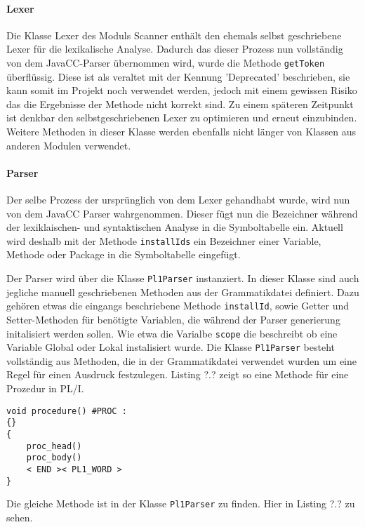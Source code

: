 \paragraph{Lexer}
Die Klasse Lexer des Moduls Scanner enthält den ehemals selbst geschriebene Lexer für die lexikalische Analyse. Dadurch das dieser Prozess nun vollständig von dem JavaCC-Parser übernommen wird, wurde die Methode \verb+getToken+ überflüssig. Diese ist als veraltet mit der Kennung 'Deprecated' beschrieben, sie kann somit im Projekt noch verwendet werden, jedoch mit einem gewissen Risiko das die Ergebnisse der Methode nicht korrekt sind. Zu einem späteren Zeitpunkt ist denkbar den selbstgeschriebenen Lexer zu optimieren und erneut einzubinden. Weitere Methoden in dieser Klasse werden ebenfalls nicht länger von Klassen aus anderen Modulen verwendet. 

\paragraph{Parser}
Der selbe Prozess der ursprünglich von dem Lexer gehandhabt wurde, wird nun von dem JavaCC Parser wahrgenommen. 
Dieser fügt nun die Bezeichner während der lexiklaischen- und syntaktischen Analyse in die Symboltabelle ein.
Aktuell wird deshalb mit der Methode \verb+installIds+ ein Bezeichner einer Variable, Methode oder Package in die Symboltabelle eingefügt.

Der Parser wird über die Klasse \verb+Pl1Parser+ instanziert. In dieser Klasse sind auch jegliche manuell geschriebenen Methoden aus der Grammatikdatei definiert. Dazu gehören etwas die eingangs beschriebene Methode \verb+installId+, sowie Getter und Setter-Methoden für benötigte Variablen, die während der Parser generierung initalisiert werden sollen. Wie etwa die Varialbe \verb+scope+ die beschreibt ob eine Variable Global oder Lokal instalisiert wurde.
Die Klasse \verb+Pl1Parser+ besteht vollständig aus Methoden, die in der Grammatikdatei verwendet wurden um eine Regel für einen Ausdruck festzulegen.
Listing ?.? zeigt so eine Methode für eine Prozedur in PL/I.

\begin{verbatim}
void procedure() #PROC :
{}
{
    proc_head()
    proc_body()
  	< END >< PL1_WORD >
}
\end{verbatim}

Die gleiche Methode ist in der Klasse \verb+Pl1Parser+ zu finden. Hier in Listing ?.? zu sehen.

